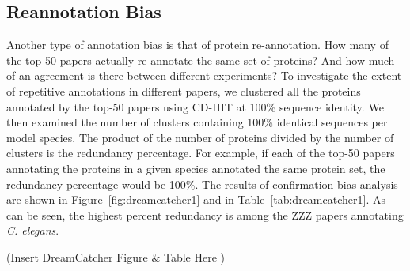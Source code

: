 \documentclass[12pt]{article}
\begin{document}

\subsection*{Reannotation Bias}

Another type of annotation bias is that of protein re-annotation. How many of the top-50 papers
actually re-annotate the same set of proteins? And how much of an agreement is there between different
experiments?
To investigate the extent of repetitive annotations in different papers, we clustered all the
proteins annotated by the top-50 papers using CD-HIT\cite{CD_HIT} at 100\% sequence identity. We
then examined the number of clusters containing 100\% identical sequences per model species. The
product of the number of proteins divided by the number of clusters is the redundancy
percentage. For example, if each of the top-50 papers annotating the proteins in a given species
annotated the same protein set, the redundancy percentage would be 100\%. The results of
confirmation bias analysis are shown in Figure~\ref{fig:dreamcatcher1} and in
Table~\ref{tab:dreamcatcher1}. As can be seen, the highest percent redundancy is among the ZZZ
papers annotating {\em C. elegans}. 

(Insert DreamCatcher Figure \& Table Here )
\end{document}
